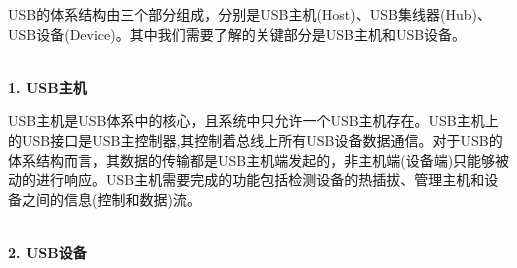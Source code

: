 USB的体系结构由三个部分组成，分别是USB主机(Host)、USB集线器(Hub)、USB设备(Device)。其中我们需要了解的关键部分是USB主机和USB设备。

\\
	
\noindent \textbf{1. USB主机}
	
	USB主机是USB体系中的核心，且系统中只允许一个USB主机存在。USB主机上的USB接口是USB主控制器,其控制着总线上所有USB设备数据通信。对于USB的体系结构而言，其数据的传输都是USB主机端发起的，非主机端(设备端)只能够被动的进行响应。USB主机需要完成的功能包括检测设备的热插拔、管理主机和设备之间的信息(控制和数据)流\cite{李雪红2004USB}\cite{莫宏伟2001USB}。


\\

\noindent \textbf{2. USB设备}

